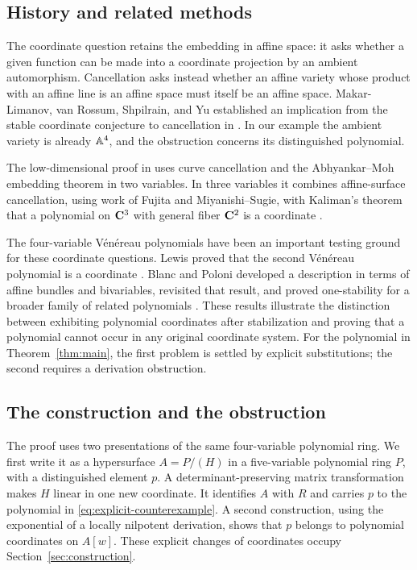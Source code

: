 \subsection*{History and related methods}
The coordinate question retains the embedding in affine space: it asks whether a given function can be made into a coordinate projection by an ambient automorphism. Cancellation asks instead whether an affine variety whose product with an affine line is an affine space must itself be an affine space. Makar-Limanov, van Rossum, Shpilrain, and Yu established an implication from the stable coordinate conjecture to cancellation in \cite[Theorem~1.2]{MakarLimanovRossumShpilrainYu2004}. In our example the ambient variety is already $\mathbb A^4$, and the obstruction concerns its distinguished polynomial.

The low-dimensional proof in \cite[proof of Proposition~1.1(c)]{ShpilrainYu2002} uses curve cancellation and the Abhyankar--Moh embedding theorem in two variables. In three variables it combines affine-surface cancellation, using work of Fujita and Miyanishi--Sugie, with Kaliman's theorem that a polynomial on $\mathbf C^3$ with general fiber $\mathbf C^2$ is a coordinate \cite[Main Theorem]{Kaliman2002}.

The four-variable V\'en\'ereau polynomials have been an important testing ground for these coordinate questions. Lewis proved that the second V\'en\'ereau polynomial is a coordinate \cite{Lewis2013}. Blanc and Poloni developed a description in terms of affine bundles and bivariables, revisited that result, and proved one-stability for a broader family of related polynomials \cite[Proposition~2.3]{BlancPoloni2022}. These results illustrate the distinction between exhibiting polynomial coordinates after stabilization and proving that a polynomial cannot occur in any original coordinate system. For the polynomial in Theorem~\ref{thm:main}, the first problem is settled by explicit substitutions; the second requires a derivation obstruction.

\subsection*{The construction and the obstruction}
The proof uses two presentations of the same four-variable polynomial ring. We first write it as a hypersurface $A=P/(H)$ in a five-variable polynomial ring $P$, with a distinguished element $p$. A determinant-preserving matrix transformation makes $H$ linear in one new coordinate. It identifies $A$ with $R$ and carries $p$ to the polynomial in \eqref{eq:explicit-counterexample}. A second construction, using the exponential of a locally nilpotent derivation, shows that $p$ belongs to polynomial coordinates on $A[w]$. These explicit changes of coordinates occupy Section~\ref{sec:construction}.

